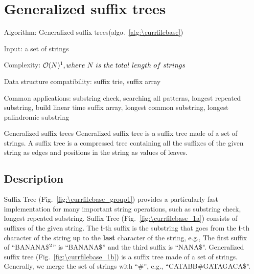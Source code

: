 \documentclass[catalog.tex]{subfiles}
\begin{document}
\def\pbname{Generalized suffix trees} %

\section{\pbname}

\begin{overview}
\item [Algorithm:] Generalized suffix trees(algo.~\ref{alg:\currfilebase})
\item [Input:] a set of strings
\item [Complexity:] $\mathcal{O}(N)\footnote{Space complexity}, where\ N\ is\ the\ total\ length\ of\ strings$
\item [Data structure compatibility:] suffix trie, suffix array
\item [Common applications:] substring check, searching all patterns, longest repeated substring, build linear time suffix array, longest common substring, longest palindromic substring
\end{overview}


\begin{problem}{\pbname}
	Generalized suffix tree is a suffix tree made of a set of strings. A suffix tree is a compressed tree containing all the suffixes of the given string as edges and positions in the string as values of leaves.
\end{problem}


\subsection*{Description}
	Suffix Tree (Fig.~\ref{fig:\currfilebase_group1}) provides a particularly fast implementation for many important string operations, such as substring check, longest repeated substring. Suffix Tree (Fig.~\ref{fig:\currfilebase_1a}) consists of suffixes of the given string. The {\bf i}-th suffix is the substring that goes from the {\bf i}-th character of the string up to the {\bf last} character of the string, e.g., The first suffix of ``BANANA\$$\footnote{We use \$ to mark the end of the string}$'' is ``BANANA\$'' and the third suffix is ``NANA\$''. Generalized suffix tree (Fig.~\ref{fig:\currfilebase_1b}) is a suffix tree made of a set of strings. Generally, we merge the set of strings with ``\#'', e.g., ``CATABB\#GATAGACA\$''.
\end{document}

